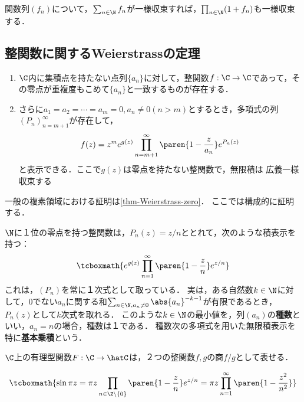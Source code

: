 \documentclass[uplatex, dvipdfmx]{jsreport}
\begin{document}
\begin{theorem}
    関数列$(f_n)$について，$\sum_{n\in\N}f_n$が一様収束すれば，$\prod_{n\in\N}(1+f_n)$も一様収束する．
\end{theorem}

\subsection{整関数に関するWeierstrassの定理}

\begin{theorem}[Weierstrass]\mbox{}\label{thm-Weierstrass-pre}
    \begin{enumerate}
        \item $\C$内に集積点を持たない点列$\{a_n\}$に対して，整関数$f:\C\to\C$であって，その零点が重複度もこめて$\{a_n\}$と一致するものが存在する．
        \item さらに$a_1=a_2=\cdots=a_m=0,a_n\ne0(n>m)$とするとき，多項式の列$(P_n)_{n=m+1}^\infty$が存在して，\[f(z)=z^me^{g(z)}\prod_{n=m+1}^\infty\paren{1-\frac{z}{a_n}}e^{P_n(z)}\]
        と表示できる．ここで$g(z)$は零点を持たない整関数で，無限積は
        広義一様収束する
    \end{enumerate}
\end{theorem}
\begin{Proof}
    一般の複素領域における証明は\ref{thm-Weierstrass-zero}．
    ここでは構成的に証明する．
\end{Proof}

\begin{example}[genus]
    $\N$に１位の零点を持つ整関数は，$P_n(z)=z/n$ととれて，次のような積表示を持つ：
    \[\tcboxmath{e^{g(z)}\prod^{\infty}_{n=1}\paren{1-\frac{z}{n}}e^{z/n}}\]
    これは，$(P_n)$を常に１次式として取っている．
    実は，ある自然数$k\in\N$に対して，$0$でない$a_n$に関する和$\sum_{n\in\N,a_n\ne0}\abs{a_n}^{-k-1}$が有限であるとき，$P_n(z)$として$k$次式を取れる．
    このような$k\in\N$の最小値を，列$(a_n)$の\textbf{種数}といい，$a_n=n$の場合，種数は１である．
    種数次の多項式を用いた無限積表示を特に\textbf{基本乗積}という．
\end{example}

\begin{corollary}
    $\C$上の有理型関数$F:\C\to\hatC$は，２つの整関数$f,g$の商$f/g$として表せる．
\end{corollary}

\begin{example}
    \[\tcboxmath{\sin\pi z=\pi z\prod_{n\in\Z\setminus\{0\}}\paren{1-\frac{z}{n}}e^{z/n}=\pi z\prod^\infty_{n=1}\paren{1-\frac{z^2}{n^2}}}\]
\end{example}
\end{document}
